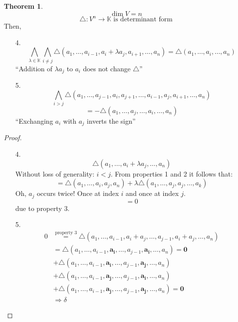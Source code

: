 \documentclass[a4paper,landscape,twocolumn]{article}
\theoremstyle{definition}
\newtheorem{theorem}{Theorem}
\begin{document}
\begin{theorem}
  \label{thm-7.7}
  \[ \dim{V} = n \]
  \[ \triangle: V^n \to \mathbb K \text{ is determinant form} \]
  Then,
  \begin{enumerate}
    \item[4.]
      \[
        \bigwedge_{\lambda \in \mathbb K} \bigwedge_{i \neq j}
        \triangle(a_1, \ldots, a_{i-1}, a_{i} + \lambda a_j, a_{i+1}, \ldots, a_n)
        = \triangle(a_1, \ldots, a_i, \ldots, a_n)
      \]
      \enquote{Addition of $\lambda a_j$ to $a_i$ does not change $\triangle$}
    \item[5.]
      \[
        \bigwedge_{i>j} \triangle(a_1, \ldots, a_{j-1}, a_i, a_{j+1}, \ldots, a_{i-1}, a_j, a_{i+1}, \ldots, a_n)
      \] \[
        = -\triangle (a_1, \ldots, a_j, \ldots, a_i, \ldots, a_n)
      \]
      \enquote{Exchanging $a_i$ with $a_j$ inverts the sign}
  \end{enumerate}
\end{theorem}
\begin{proof}
  \begin{enumerate}
    \item[4.]
      \[
        \triangle(a_1, \ldots, a_i + \lambda a_j, \ldots, a_n)
      \]
      Without loss of generality: $i < j$.
      From properties 1 and 2 it follows that:
      \[
        = \triangle (a_1, \ldots, a_i, a_j, a_n)
        + \lambda \triangle(a_1, \ldots, a_j, a_j, \ldots, a_k)
      \]
      Oh, $a_j$ occurs twice! Once at index $i$ and once at index $j$.
      \[ = 0 \]
      due to property 3.
    \item[5.]
      \begin{align*}
        0 &\stackrel{\text{property~3}}= \triangle (a_1, \ldots, a_{i-1}, a_i + a_j, \ldots, a_{j-1}, a_i + a_j, \ldots, a_n) \\
          &= \triangle(a_1, \ldots, a_{i-1}, \mathbf{a_i}, \ldots, a_{j-1}, \mathbf{a_i}, \ldots, a_n) \mathbf{= 0} \\
          &+ \triangle(a_1, \ldots, a_{i-1}, \mathbf{a_i}, \ldots, a_{j-1}, \mathbf{a_j}, \ldots, a_n) \\
          &+ \triangle(a_1, \ldots, a_{i-1}, \mathbf{a_j}, \ldots, a_{j-1}, \mathbf{a_i}, \ldots, a_n) \\
          &+ \triangle(a_1, \ldots, a_{i-1}, \mathbf{a_j}, \ldots, a_{j-1}, \mathbf{a_j}, \ldots, a_n) \mathbf{= 0} \\
          &\Rightarrow \delta
      \end{align*}
  \end{enumerate}
\end{proof}
\end{document}
